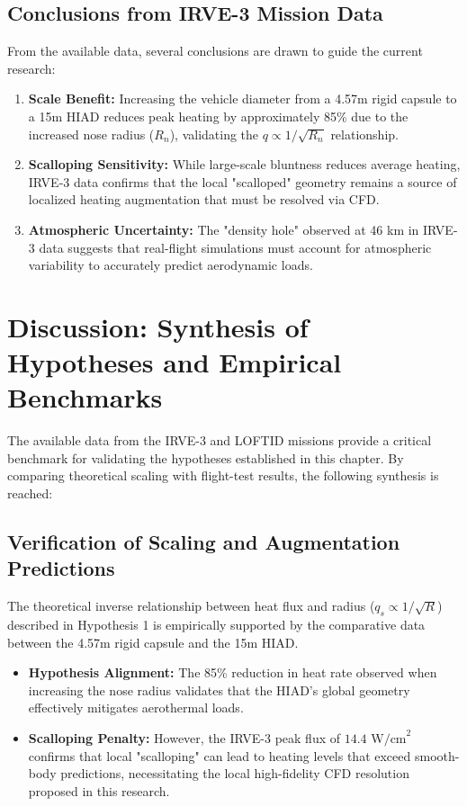 \subsection{Conclusions from IRVE-3 Mission Data}
From the available data, several conclusions are drawn to guide the current research:
\begin{enumerate}
    \item \textbf{Scale Benefit:} Increasing the vehicle diameter from a 4.57m rigid capsule to a 15m HIAD reduces peak heating by approximately 85\% due to the increased nose radius ($R_n$), validating the $q \propto 1/\sqrt{R_n}$ relationship.
    \item \textbf{Scalloping Sensitivity:} While large-scale bluntness reduces average heating, IRVE-3 data confirms that the local "scalloped" geometry remains a source of localized heating augmentation that must be resolved via CFD.
    \item \textbf{Atmospheric Uncertainty:} The "density hole" observed at 46 km in IRVE-3 data suggests that real-flight simulations must account for atmospheric variability to accurately predict aerodynamic loads.
\end{enumerate}

\section{Discussion: Synthesis of Hypotheses and Empirical Benchmarks}

The available data from the IRVE-3 and LOFTID missions provide a critical benchmark for validating the hypotheses established in this chapter. By comparing theoretical scaling with flight-test results, the following synthesis is reached:

\subsection{Verification of Scaling and Augmentation Predictions}
The theoretical inverse relationship between heat flux and radius ($q_s \propto 1/\sqrt{R}$) described in Hypothesis 1 is empirically supported by the comparative data between the 4.57m rigid capsule and the 15m HIAD. 
\begin{itemize}
    \item \textbf{Hypothesis Alignment:} The 85\% reduction in heat rate observed when increasing the nose radius validates that the HIAD’s global geometry effectively mitigates aerothermal loads.
    \item \textbf{Scalloping Penalty:} However, the IRVE-3 peak flux of $14.4 \text{ W/cm}^2$ confirms that local "scalloping" can lead to heating levels that exceed smooth-body predictions, necessitating the local high-fidelity CFD resolution proposed in this research.
\end{itemize}

